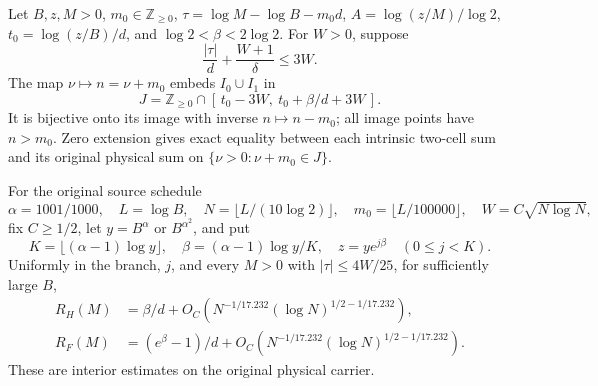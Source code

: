 \begin{proposition}
\label{prop:Mazur-physical-centers}
Let $B,z,M>0$, $m_0\in\mathbb Z_{\ge0}$,
$\tau=\log M-\log B-m_0d$, $A=\log(z/M)/\log2$,
$t_0=\log(z/B)/d$, and $\log2<\beta<2\log2$.
For $W>0$, suppose
\begin{equation}
 \frac{|\tau|}{d}+\frac{W+1}{\delta}\le3W.
 \label{eq:Mazur-directional-margin}
\end{equation}
The map $\nu\mapsto n=\nu+m_0$ embeds $I_0\cup I_1$ in
\[
 J=\mathbb Z_{\ge0}\cap
       [\,t_0-3W,\ t_0+\beta/d+3W\,].
\]
It is bijective onto its image with inverse $n\mapsto n-m_0$;
all image points have $n>m_0$. Zero extension gives exact equality
between each intrinsic two-cell sum and its original physical sum
on $\{\nu>0:\nu+m_0\in J\}$.

For the original source schedule
\[
 \alpha=1001/1000,\quad L=\log B,\quad
 N=\lfloor L/(10\log2)\rfloor,\quad m_0=\lfloor L/100000\rfloor,
 \quad W=C\sqrt{N\log N},
\]
fix $C\ge1/2$, let $y=B^\alpha$ or $B^{\alpha^2}$, and put
\[
 K=\lfloor(\alpha-1)\log y\rfloor,\quad
 \beta=(\alpha-1)\log y/K,\quad z=y e^{j\beta}\quad(0\le j<K).
\]
Uniformly in the branch, $j$, and every $M>0$ with
$|\tau|\le4W/25$, for sufficiently large $B$,
\begin{align}
 R_H(M)&=\beta/d+
 O_C\!\left(N^{-1/17.232}(\log N)^{1/2-1/17.232}\right),\\
 R_F(M)&=(e^\beta-1)/d+
 O_C\!\left(N^{-1/17.232}(\log N)^{1/2-1/17.232}\right).
 \label{eq:Mazur-physical-centers}
\end{align}
These are interior estimates on the original physical carrier.
\end{proposition}

